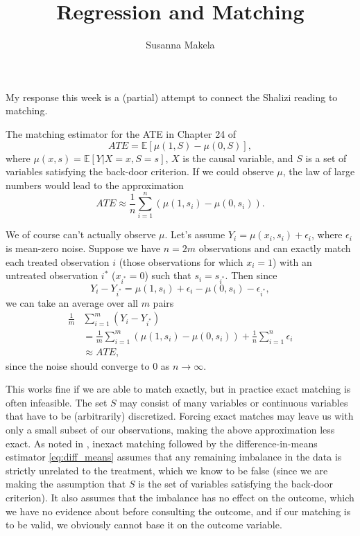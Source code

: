 \documentclass[10pt,a4paper]{article}
\author{Susanna Makela}
\title{Regression and Matching}
\begin{document}
\maketitle

My response this week is a (partial) attempt to connect the Shalizi reading to matching.

The matching estimator for the ATE in Chapter 24 of \textcite{shalizi}
\[
	ATE = \mathbb{E}[\mu(1, S) - \mu(0, S)],
\]
where $\mu(x, s) = \mathbb{E}[Y|X = x, S = s]$, $X$ is the causal variable, and $S$ is a set of variables satisfying the back-door criterion. If we could observe $\mu$, the law of large numbers would lead to the approximation
\begin{equation}\label{eq:ate_approx}
	ATE \approx \frac{1}{n} \sum_{i=1}^n (\mu(1, s_i) - \mu(0, s_i)).
\end{equation}

We of course can't actually observe $\mu$. Let's assume $Y_i = \mu(x_i, s_i) + \epsilon_i$, where $\epsilon_i$ is mean-zero noise. Suppose we have $n = 2m$ observations and can exactly match each treated observation $i$ (those observations for which $x_i=1$) with an untreated observation $i^*$ ($x_{i^*}=0$) such that $s_i = s_{i^*}$. Then since
\[
	Y_i - Y_{i^*} = \mu(1, s_i) + \epsilon_i - \mu(0, s_i) - \epsilon_{i^*},
\]
we can take an average over all $m$ pairs
\begin{align}
	\frac{1}{m} &\sum_{i=1}^m (Y_i - Y_{i^*}) \label{eq:diff_means}\\
	&= \frac{1}{m} \sum_{i=1}^m (\mu(1, s_i) - \mu(0, s_i)) + \frac{1}{n} \sum_{i=1}^n \epsilon_i \nonumber\\
	&\approx ATE \nonumber,
\end{align}
since the noise should converge to 0 as $n \rightarrow \infty$.

This works fine if we are able to match exactly, but in practice exact matching is often infeasible. The set $S$ may consist of many variables or continuous variables that have to be (arbitrarily) discretized. Forcing exact matches may leave us with only a small subset of our observations, making the above approximation less exact. As noted in \textcite{ho_etal}, inexact matching followed by the difference-in-means estimator \eqref{eq:diff_means} assumes that any remaining imbalance in the data is strictly unrelated to the treatment, which we know to be false (since we are making the assumption that $S$ is the set of variables satisfying the back-door criterion). It also assumes that the imbalance has no effect on the outcome, which we have no evidence about before consulting the outcome, and if our matching is to be valid, we obviously cannot base it on the outcome variable.
\end{document}
